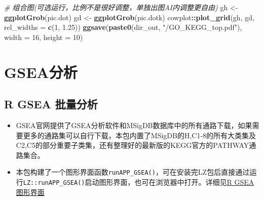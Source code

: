 \documentclass[
]{book}
\newenvironment{Shaded}{\begin{snugshade}}{\end{snugshade}}
\newcommand{\AttributeTok}[1]{\textcolor[rgb]{0.13,0.29,0.53}{#1}}
\newcommand{\CommentTok}[1]{\textcolor[rgb]{0.56,0.35,0.01}{\textit{#1}}}
\newcommand{\DecValTok}[1]{\textcolor[rgb]{0.00,0.00,0.81}{#1}}
\newcommand{\FloatTok}[1]{\textcolor[rgb]{0.00,0.00,0.81}{#1}}
\newcommand{\FunctionTok}[1]{\textcolor[rgb]{0.13,0.29,0.53}{\textbf{#1}}}
\newcommand{\NormalTok}[1]{#1}
\newcommand{\OtherTok}[1]{\textcolor[rgb]{0.56,0.35,0.01}{#1}}
\newcommand{\SpecialCharTok}[1]{\textcolor[rgb]{0.81,0.36,0.00}{\textbf{#1}}}
\newcommand{\StringTok}[1]{\textcolor[rgb]{0.31,0.60,0.02}{#1}}
\begin{document}
\begin{Shaded}
\begin{Highlighting}[]
\CommentTok{\# 组合图(可选运行，比例不是很好调整，单独出图AI内调整更自由)}
\NormalTok{gh }\OtherTok{\textless{}{-}} \FunctionTok{ggplotGrob}\NormalTok{(pic.dot)}
\NormalTok{gd }\OtherTok{\textless{}{-}} \FunctionTok{ggplotGrob}\NormalTok{(pic.dotk)}
\NormalTok{cowplot}\SpecialCharTok{::}\FunctionTok{plot\_grid}\NormalTok{(gh, gd, }\AttributeTok{rel\_widths =} \FunctionTok{c}\NormalTok{(}\DecValTok{1}\NormalTok{, }\FloatTok{1.25}\NormalTok{))}
\FunctionTok{ggsave}\NormalTok{(}\FunctionTok{paste0}\NormalTok{(dir\_out, }\StringTok{"/GO\_KEGG\_top.pdf"}\NormalTok{), }\AttributeTok{width =} \DecValTok{16}\NormalTok{, }\AttributeTok{height =} \DecValTok{10}\NormalTok{)}
\end{Highlighting}
\end{Shaded}

\section{GSEA分析}\label{enrich-gsea}

\subsection{R GSEA 批量分析}\label{r-gsea-ux6279ux91cfux5206ux6790}

\begin{itemize}
\item
  GSEA官网提供了GSEA分析软件和MSigDB数据库中的所有通路下载，如果需要更多的通路集可以自行下载，本包内置了MSigDB的H,C1-8的所有大类集及C2,C5的部分重要子类集，还有整理好的最新版的KEGG官方的PATHWAY通路集合。
\item
  本包构建了一个图形界面函数\texttt{runAPP\_GSEA()}，可在安装完LZ包后直接通过运行\texttt{LZ::runAPP\_GSEA()}启动图形界面，也可在浏览器中打开。详细见\hyperref[enrich-gsea-r.gsea.gui]{R GSEA 图形界面}
\end{itemize}
\end{document}
